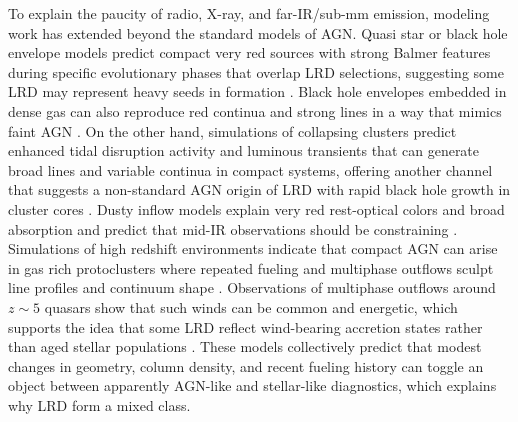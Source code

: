 \documentclass[utf8]{FrontiersinHarvard} %
\begin{document}
To explain the paucity of radio, X-ray, and far-IR/sub-mm emission, modeling work has extended beyond the standard models of AGN. 
Quasi star or black hole envelope models predict compact very red sources with strong Balmer features during specific evolutionary phases that overlap LRD selections, suggesting some LRD may represent heavy seeds in formation \citep{begelman2025little,durodola2025exploring}. 
Black hole envelopes embedded in dense gas can also reproduce red continua and strong lines in a way that mimics faint AGN \citep{kido2025black,naidu2025black}. 
On the other hand, simulations of collapsing clusters predict enhanced tidal disruption activity and luminous transients that can generate broad lines and variable continua in compact systems, offering another channel that suggests a non-standard AGN origin of LRD with rapid black hole growth in cluster cores \citep{bellovary2025little}. 
Dusty inflow models explain very red rest-optical colors and broad absorption and predict that mid-IR observations should be constraining \citep{li2025little}. 
Simulations of high redshift environments indicate that compact AGN can arise in gas rich protoclusters where repeated fueling and multiphase outflows sculpt line profiles and continuum shape
\citep{kannan2025introducing}. 
Observations of multiphase outflows around $z \sim 5$ quasars show that such winds can be common and energetic, which supports the idea that some LRD reflect wind-bearing accretion states rather than aged stellar populations \citep{brazzini2025multi}. These models collectively predict that modest changes in geometry, column density, and recent fueling history can toggle an object between apparently AGN-like and stellar-like diagnostics, which explains why LRD form a mixed class.
\end{document}

